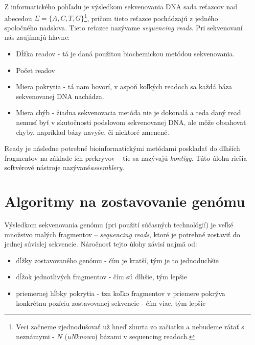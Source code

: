 Z informatického pohľadu je výsledkom sekvenovania DNA sada reťazcov nad abecedou $\Sigma = \{A, C, T, G\}$\footnote{Veci začneme zjednodušovať už hneď zhurta zo začiatku a nebudeme rátať s neznámymi - $N$ (\emph{uNknown}) bázami v sequencing readoch.}, pričom tieto reťazce pochádzajú z jedného spoločného nadslova. Tieto reťazce nazývame \emph{sequencing reads}. Pri sekvenovaní nás zaujímajú hlavne:

\begin{itemize}
    \item Dĺžka readov - tá je daná použitou biochemickou metódou sekvenovania.
    \item Počet readov
    \item Miera pokrytia - tá nam hovorí, v aspoň koľkých readoch sa každá báza sekvenovanej DNA nachádza.
    \item Miera chýb - žiadna sekvenovacia metóda nie je dokonalá a teda daný read nemusí byť v skutočnosti podslovom sekvenovanej DNA, ale môže obsahovať chyby, napríklad bázy navyše, či niektoré zmenené.
\end{itemize}

Ready je následne potrebné bioinformatickými metódami poskladať do dlhších fragmentov na základe ich prekryvov -- tie sa nazývajú \emph{kontigy}. Túto úlohu riešia softvérové nástroje nazývané\emph{assemblery}.


\section{Algoritmy na zostavovanie genómu}
    Výsledkom sekvenovania genómu (pri použití súčasných technológií) je veľké
    množstvo malých fragmentov -- \emph{sequencing reads}, ktoré je potrebné
    zostaviť do jednej súvislej sekvencie. Náročnosť tejto úlohy závisí najmä
    od:
    
    \begin{itemize}
        \item dĺžky zostavovaného genómu - čím je kratší, tým je to jednoduchšie
        \item dĺžok jednotlivých fragmentov - čím sú dlhšie, tým lepšie
        \item priemernej hĺbky pokrytia - tzn koľko fragmentov v priemere
        pokrýva konkrétnu pozíciu zostavovanej sekvencie - čím viac, tým lepšie
    \end{itemize}

